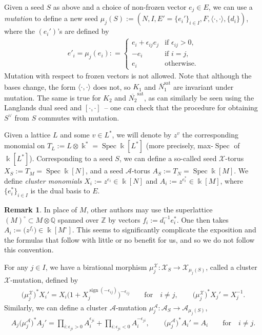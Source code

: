 \documentclass[pdftex]{sigma}
\numberwithin{equation}{section}
\numberwithin{figure}{section}
\numberwithin{table}{section}
\DeclareMathOperator{\Spec}{Spec}
\DeclareMathOperator{\sign}{sign}
\DeclareMathOperator{\sat}{sat}
\let\?=\overline
\let\bb=\mathbb
\let\rar=\rightarrow
\let\s=\mathcal
\let\mb=\mbox
\newcommand {\kk} {\Bbbk}
\theoremstyle{definition}
\newtheorem{rmk}[thm]{Remark}
\begin{document}
Given a seed $S$ as above and a choice of non-frozen vector $e_j\in E$, we can use a {\it mutation} to define a new seed $\mu_j(S):=(N,I,E'=\{e_i'\}_{i\in I},F,\langle\cdot,\cdot\rangle,\{d_i\})$, where the $(e_i')$'s are defined by
\begin{gather}\label{seedmut}
 e'_{i} = \mu_{j}(e_{i}): = \begin{cases}
 e_{i}+\epsilon_{ij}e_{j} &\mb{if $\epsilon_{ij} >0$}, \\
 -e_{i} &\mb{if $i=j$}, \\
	e_{i} &\mb{otherwise}.
	\end{cases}
\end{gather}
Mutation with respect to frozen vectors is not allowed. Note that although the bases change, the form $\langle \cdot,\cdot\rangle$ does not, so $K_1$ and $\?{N}_1^{\sat}$ are invariant under mutation. The same is true for $K_2$ and $\?{N_2}^{\sat}$, as can similarly be seen using the Langlands dual seed and $[\cdot,\cdot]$~-- one can check that the procedure for obtaining $S^{\vee}$ from $S$ commutes with mutation.

Given a lattice $L$ and some $v\in L^*$, we will denote by $z^v$ the corresponding monomial on $T_L:=L\otimes \kk^*=\Spec \kk[L^*]$ (more precisely, max-$\Spec$ of $\kk[L^*]$). Corresponding to a seed $S$, we can define a so-called seed $\s{X}$-torus $X_S:=T_{M}=\Spec \kk[N]$, and a seed $\s{A}$-torus $A_S:=T_{N}=\Spec \kk[M]$.
 We define {\it cluster monomials} $X_i:=z^{e_i}\in \kk[N]$ and $A_i:=z^{e_i^*}\in \kk[M]$, where $\{ e_i^*\}_{i\in I}$ is the dual basis to $E$.

\begin{rmk}\label{convention-departure}In place of $M$, other authors may use the superlattice $(M)^{\circ}\subset M\otimes \bb{Q}$ spanned over $\bb{Z}$ by vectors $f_i:=d_i^{-1}e_i^*$. One then takes $A_i:=\big(z^{f_i}\big) \in \kk[M^{\circ}]$. This seems to significantly complicate the exposition and the formulas that follow with little or no benefit for us, and so we do not follow this convention.
\end{rmk}

For any $j\in I$, we have a birational morphism $\mu_j^{\s{X}}\colon \s{X}_S\rar \s{X}_{\mu_j(S)}$, called a cluster $\s{X}$-mutation, defined by
\begin{gather*}
	\big(\mu_j^{\s{X}}\big)^* X_i' = 	X_i\big(1+X_j^{\sign(-\epsilon_{ij})}\big)^{-\epsilon_{ij}} \qquad \text{for} \quad i\neq j, \qquad \big(\mu_j^{\s{X}}\big)^* X_j' = X_j^{-1} .
\end{gather*}
Similarly, we can define a cluster $\s{A}$-mutation $\mu_j^{\s{A}}\colon \s{A}_S\rar \s{A}_{\mu_j(S)}$,
\begin{gather*}
	A_{j}\big(\mu_j^{\s{A}}\big)^* A_{j}' =\prod_{i\colon \epsilon_{ji}>0} A_{i}^{\epsilon_{ji}} + \prod_{i\colon \epsilon_{ji}<0} A_{i}^{-\epsilon_{ji}},\qquad \big(\mu_j^{\s{A}}\big)^*	A_{i}'=A_{i} \qquad \text{for} \quad i\neq j.
\end{gather*}
\end{document}
